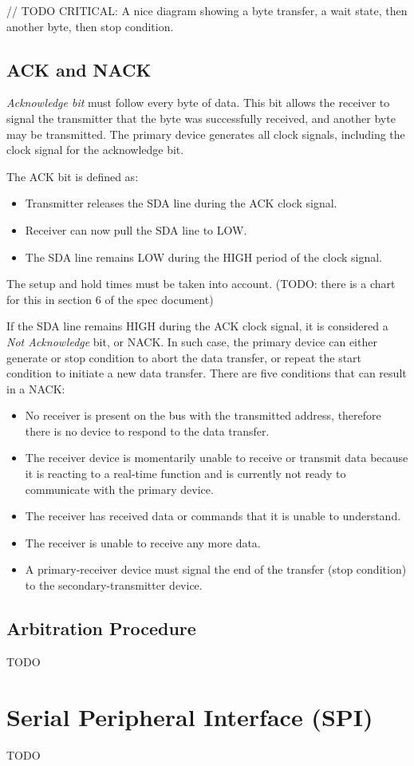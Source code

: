 \documentclass[a4paper,12pt,twoside]{report}
\begin{document}
                    // TODO CRITICAL: A nice diagram showing a byte transfer, a wait state, then another byte, then stop condition.

                \subsection{ACK and NACK}
                    \textit{Acknowledge bit} must follow every byte of data. This bit allows the receiver to signal the transmitter that the byte was successfully received, and another byte may be transmitted. The primary device generates all clock signals, including the clock signal for the acknowledge bit.

                    The ACK bit is defined as:
                    \begin{itemize}
                        \item Transmitter releases the SDA line during the ACK clock signal.
                        \item Receiver can now pull the SDA line to LOW.
                        \item The SDA line remains LOW during the HIGH period of the clock signal.
                    \end{itemize}

                    The setup and hold times must be taken into account. (TODO: there is a chart for this in section 6 of the spec document)

                    If the SDA line remains HIGH during the ACK clock signal, it is considered a \textit{Not Acknowledge} bit, or NACK. In such case, the primary device can either generate or stop condition to abort the data transfer, or repeat the start condition to initiate a new data transfer. There are five conditions that can result in a NACK:
                    \begin{itemize}
                        \item No receiver is present on the bus with the transmitted address, therefore there is no device to respond to the data transfer.
                        \item The receiver device is momentarily unable to receive or transmit data because it is reacting to a real-time function and is currently not ready to communicate with the primary device.
                        \item The receiver has received data or commands that it is unable to understand.
                        \item The receiver is unable to receive any more data.
                        \item A primary-receiver device must signal the end of the transfer (stop condition) to the secondary-transmitter device.
                    \end{itemize}

                \subsection{Arbitration Procedure}
                    TODO

            \section{Serial Peripheral Interface (SPI)}
                TODO
    \printbibliography
\end{document}

